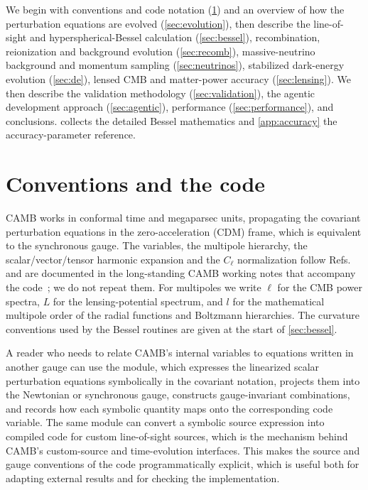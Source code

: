 \documentclass[prd, twocolumn, superscriptaddress, tightenlines, longbibliography, nofootinbib, eqsecnum, amsfonts, amsmath, floatfix, notitlepage]{revtex4-2}
\newcommand{\code}[1]{\texttt{\detokenize{#1}}}
\begin{document}
We begin with conventions and code notation (\cref{sec:conventions}) and an
overview of how the perturbation equations are evolved (\cref{sec:evolution}),
then describe the line-of-sight and hyperspherical-Bessel calculation
(\cref{sec:bessel}), recombination, reionization and background evolution
(\cref{sec:recomb}), massive-neutrino background and momentum sampling
(\cref{sec:neutrinos}), stabilized dark-energy evolution (\cref{sec:de}), lensed
CMB and matter-power accuracy (\cref{sec:lensing}). We then describe the validation methodology
(\cref{sec:validation}), the agentic development approach (\cref{sec:agentic}),
performance (\cref{sec:performance}), and conclusions.
 collects the detailed Bessel mathematics
and \cref{app:accuracy} the accuracy-parameter reference.

\section{Conventions and the code}
\label{sec:conventions}

\textsc{CAMB} works in conformal time and megaparsec units, propagating the
covariant perturbation equations in the zero-acceleration (CDM) frame, which is
equivalent to the synchronous gauge. The variables, the multipole hierarchy, the
scalar/vector/tensor harmonic expansion and the $C_\ell$ normalization follow
Refs.~\cite{Challinor:2000as,Lewis:2004ef} and are documented in the long-standing
\textsc{CAMB} working notes that accompany the code~\cite{camb_notes}; we do not
repeat them. For multipoles we write $\ell$ for the CMB power spectra, $L$ for
the lensing-potential spectrum, and $l$ for the mathematical multipole order of
the radial functions and Boltzmann hierarchies. The curvature conventions used
by the Bessel routines are given at the start of \cref{sec:bessel}.

A reader who needs to relate \textsc{CAMB}'s internal variables to equations
written in another gauge can use the \code{camb.symbolic} module, which expresses
the linearized scalar perturbation equations symbolically in the covariant
notation, projects them into the Newtonian or synchronous gauge, constructs
gauge-invariant combinations, and records how each symbolic quantity maps onto the
corresponding code variable. The same module can convert a symbolic source
expression into compiled code for custom line-of-sight sources, which is the
mechanism behind \textsc{CAMB}'s custom-source and time-evolution interfaces.
This makes the source and gauge conventions of the code programmatically explicit,
which is useful both for adapting external results and for checking the
implementation.
\end{document}
